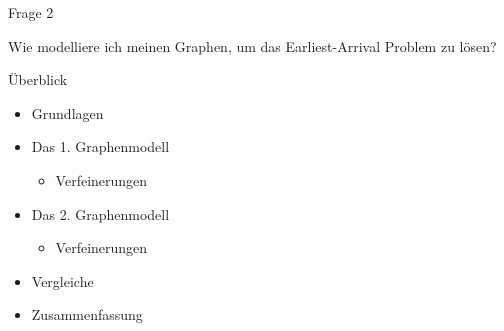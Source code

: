 \begin{frame}{Frage 2}
	\vspace{6em}
	\begin{center}
		\begin{Large}
			Wie modelliere ich meinen Graphen, um das Earliest-Arrival Problem zu lösen?
		\end{Large}
	\end{center}
\end{frame}


\begin{frame}{Überblick}
	\begin{itemize}
		\item Grundlagen
	\end{itemize}
	\vspace{1em}
	\begin{itemize}
		\item Das 1. Graphenmodell
		\begin{itemize}
			\item Verfeinerungen
		\end{itemize}
	\end{itemize}
	\vspace{1em}
	\begin{itemize}
		\item Das 2. Graphenmodell
		\begin{itemize}
			\item Verfeinerungen
		\end{itemize}
	\end{itemize}
	\vspace{1em}
	\begin{itemize}
		\item Vergleiche
	\end{itemize}
	\vspace{1em}
	\begin{itemize}
		\item Zusammenfassung
	\end{itemize}
\end{frame}


